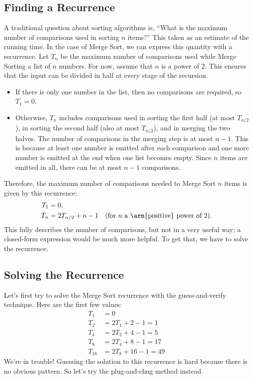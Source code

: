\subsection{Finding a Recurrence}
A traditional question about sorting algorithms is, ``What is the
maximum number of comparisons used in sorting $n$ items?''  This taken
as an estimate of the running time.  In the case of Merge Sort, we can
express this quantity with a recurrence.  Let $T_n$ be the maximum
number of comparisons used while Merge Sorting a list of $n$ numbers.
For now, assume that $n$ is a power of 2.  This ensures that the input
can be divided in half at every stage of the recursion.
\begin{itemize}
\item If there is only one number in the list, then no comparisons are
  required, so $T_1 = 0$.
\item Otherwise, $T_n$ includes comparisons used in sorting the first
  half (at most $T_{n/2}$), in sorting the second half (also at most
  $T_{n/2}$), and in merging the two halves.  The number of
  comparisons in the merging step is at most $n - 1$.  This is because
  at least one number is emitted after each comparison and one more
  number is emitted at the end when one list becomes empty.  Since $n$
  items are emitted in all, there can be at most $n - 1$ comparisons.
\end{itemize}
Therefore, the maximum number of comparisons needed to Merge Sort $n$
items is given by this recurrence:
\begin{align}
T_1 & = 0, \\
T_{n} & = 2 T_{n/2} + n - 1 & \text{(for $n$ a \arm{positive} power of 2)}.
\end{align}
This fully describes the number of comparisons, but not in a very
useful way; a closed-form expression would be much more helpful.  To
get that, we have to solve the recurrence.

\subsection{Solving the Recurrence}

Let's first try to solve the Merge Sort recurrence with the
guess-and-verify technique.  Here are the first few values:
\begin{align*}
T_1 & = 0 \\
T_2 & = 2 T_1 + 2 - 1 = 1 \\
T_4 & = 2 T_2 + 4 - 1 = 5 \\
T_8 & = 2 T_4 + 8 - 1 = 17 \\
T_{16} & = 2 T_8 + 16 - 1 = 49
\end{align*}
We're in trouble!  Guessing the solution to this recurrence is hard
because there is no obvious pattern.  So let's try the plug-and-chug
method instead.

